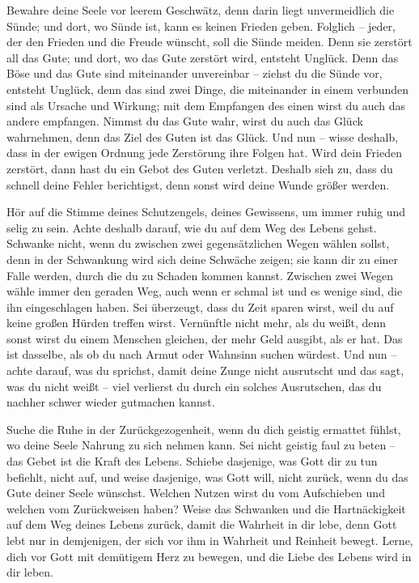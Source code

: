 Bewahre deine Seele vor leerem Geschwätz, denn darin liegt unvermeidlich die Sünde; und dort, wo Sünde ist, kann es keinen Frieden geben. Folglich -- jeder, der den Frieden und die Freude wünscht, soll die Sünde meiden. Denn sie zerstört all das Gute; und dort, wo das Gute zerstört wird, entsteht Unglück. Denn das Böse und das Gute sind miteinander unvereinbar -- ziehst du die Sünde vor, entsteht Unglück, denn das sind zwei Dinge, die miteinander in einem verbunden sind als Ursache und Wirkung; mit dem Empfangen des einen wirst du auch das andere empfangen. Nimmst du das Gute wahr, wirst du auch das Glück wahrnehmen, denn das Ziel des Guten ist das Glück. Und nun -- wisse deshalb, dass in der ewigen Ordnung jede Zerstörung ihre Folgen hat. Wird dein Frieden zerstört, dann hast du ein Gebot des Guten verletzt. Deshalb sieh zu, dass du schnell deine Fehler berichtigst, denn sonst wird deine Wunde größer werden.

Hör auf die Stimme deines Schutzengels, deines Gewissens, um immer ruhig und selig zu sein. Achte deshalb darauf, wie du auf dem Weg des Lebens gehst. Schwanke nicht, wenn du zwischen zwei gegensätzlichen Wegen wählen sollst, denn in der Schwankung wird sich deine Schwäche zeigen; sie kann dir zu einer Falle werden, durch die du zu Schaden kommen kannst. Zwischen zwei Wegen wähle immer den geraden Weg, auch wenn er schmal ist und es wenige sind, die ihn eingeschlagen haben. Sei überzeugt, dass du Zeit sparen wirst, weil du auf keine großen Hürden treffen wirst. Vernünftle nicht mehr, als du weißt, denn sonst wirst du einem Menschen gleichen, der mehr Geld ausgibt, als er hat. Das ist dasselbe, als ob du nach Armut oder Wahnsinn suchen würdest. Und nun -- achte darauf, was du sprichst, damit deine Zunge nicht ausrutscht und das sagt, was du nicht weißt -- viel verlierst du durch ein solches Ausrutschen, das du nachher schwer wieder gutmachen kannst.

Suche die Ruhe in der Zurückgezogenheit, wenn du dich geistig ermattet fühlst, wo deine Seele Nahrung zu sich nehmen kann. Sei nicht geistig faul zu beten -- das Gebet ist die Kraft des Lebens. Schiebe dasjenige, was Gott dir zu tun befiehlt, nicht auf, und weise dasjenige, was Gott will, nicht zurück, wenn du das Gute deiner Seele wünschst. Welchen Nutzen wirst du vom Aufschieben und welchen vom Zurückweisen haben? Weise das Schwanken und die Hartnäckigkeit auf dem Weg deines Lebens zurück, damit die Wahrheit in dir lebe, denn Gott lebt nur in demjenigen, der sich vor ihm in Wahrheit und Reinheit bewegt. Lerne, dich vor Gott mit demütigem Herz zu bewegen, und die Liebe des Lebens wird in dir leben.

